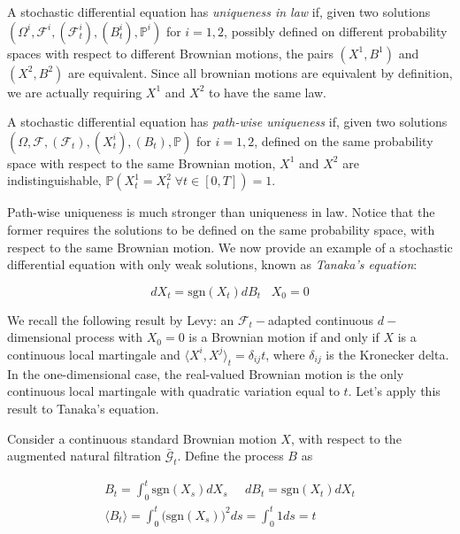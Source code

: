 \begin{definition}
    A stochastic differential equation has \textit{uniqueness in law} if, given two solutions $(\Omega^i, \mathcal{F}^i, (\mathcal{F}^i_t),(B_t^i),\mathbb{P}^i)$ for $i = 1,2$, possibly defined on different probability spaces with respect to different Brownian motions, the pairs $(X^1,B^1)$ and $(X^2,B^2)$ are equivalent. Since all brownian motions are equivalent by definition, we are actually requiring $X^1$ and $X^2$ to have the same law.
\end{definition}

\begin{definition}
    A stochastic differential equation has \textit{path-wise uniqueness} if, given two solutions $(\Omega,\mathcal{F},(\mathcal{F}_t),(X_t^i),(B_t),\mathbb{P})$ for $i=1,2$, defined on the same probability space with respect to the same Brownian motion, $X^1$ and $X^2$ are indistinguishable, $\mathbb{P}(X^1_t = X^2_t \; \forall t \in [0,T]) = 1$. 
\end{definition}

Path-wise uniqueness is much stronger than uniqueness in law. Notice that the former requires the solutions to be defined on the same probability space, with respect to the same Brownian motion. We now provide an example of a stochastic differential equation with only weak solutions, known as \textit{Tanaka's equation}:

\begin{equation}
    dX_t = \text{sgn}(X_t) dB_t \;\;\; X_0 = 0 
\end{equation}

We recall the following result by Levy: an $\mathcal{F}_t-$adapted continuous $d-$dimensional process with $X_0=0$ is a Brownian motion if and only if $X$ is a continuous local martingale and $\langle X^i, X^j \rangle_t = \delta_{ij} t$, where $\delta_{ij}$ is the Kronecker delta. In the one-dimensional case, the real-valued Brownian motion is the only continuous local martingale with quadratic variation equal to $t$. Let's apply this result to Tanaka's equation.

Consider a continuous standard Brownian motion $X$, with respect to the augmented natural filtration $\bar{\mathcal{G}}_t$. Define the process $B$ as 

\begin{gather*}
    B_t = \int_0^t \text{sgn}(X_s) dX_s \;\;\;\;\; dB_t = \text{sgn}(X_t)dX_t \\
    \langle B_t \rangle = \int_0^t \Big( \text{sgn}(X_s) \Big)^2 ds = \int_0^t 1 ds = t
\end{gather*}

